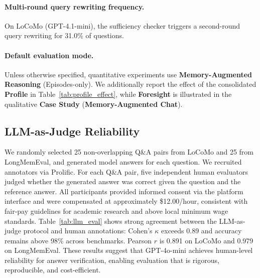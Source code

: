 \paragraph{Multi-round query rewriting frequency.} On LoCoMo (GPT-4.1-mini), the sufficiency checker triggers a second-round query rewriting for 31.0\% of questions.

\paragraph{Default evaluation mode.} Unless otherwise specified, quantitative experiments use \textbf{Memory-Augmented Reasoning} (Episodes-only). We additionally report the effect of the consolidated \textbf{Profile} in Table~\ref{tab:profile_effect}, while \textbf{Foresight} is illustrated in the qualitative \textbf{Case Study} (\textbf{Memory-Augmented Chat}).

\subsection{LLM-as-Judge Reliability}
\label{sec:judge_reliability}
We randomly selected 25 non-overlapping Q\&A pairs from LoCoMo and 25 from LongMemEval, and generated model answers for each question. We recruited annotators via Prolific. For each Q\&A pair, five independent human evaluators judged whether the generated answer was correct given the question and the reference answer. All participants provided informed consent via the platform interface and were compensated at approximately \$12.00/hour, consistent with fair-pay guidelines for academic research and above local minimum wage standards. Table~\ref{tab:llm_eval} shows strong agreement between the LLM-as-judge protocol and human annotations: Cohen’s $\kappa$ exceeds 0.89 and accuracy remains above 98\% across benchmarks. Pearson $r$ is 0.891 on LoCoMo and 0.979 on LongMemEval. These results suggest that GPT-4o-mini achieves human-level reliability for answer verification, enabling evaluation that is rigorous, reproducible, and cost-efficient.

\begin{table}[h]
\centering
\caption{Reliability matrix for LLM-as-Judge.}
\label{tab:llm_eval}
\end{table}

